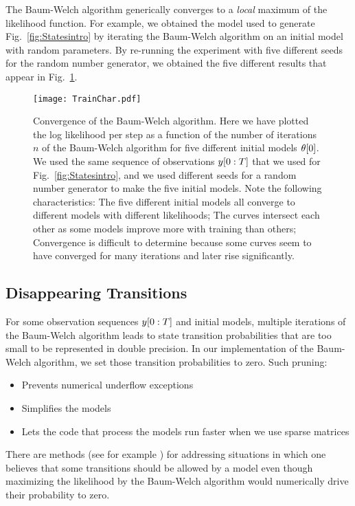 The Baum-Welch algorithm generically converges to a \emph{local}
maximum of the likelihood function.  For example, we obtained the
model used to generate Fig.~\ref{fig:Statesintro} by iterating the
Baum-Welch algorithm on an initial model with random parameters.  By
re-running the experiment with five different seeds for the random
number generator, we obtained the five different results that appear
in Fig.~\ref{fig:TrainChar}.
\begin{figure}
  \centering
  \texttt{[image: TrainChar.pdf]}
  \caption[Convergence of the Baum-Welch algorithm.]{%
    Convergence of the Baum-Welch algorithm.  Here we have
    plotted the log likelihood per step as a function of the number of
    iterations $n$ of the Baum-Welch algorithm for five different
    initial models ${\theta}{[0]}$.  We used the same sequence
    of observations $y[0:T]$ that we used for
    Fig.~\ref{fig:Statesintro}, and we used different seeds for a
    random number generator to make the five initial models.  Note the
    following characteristics: The five different initial models all
    converge to different models with different likelihoods; The curves
    intersect each other as some models improve more with training
    than others; Convergence is difficult to determine because some
    curves seem to have converged for many iterations and later rise
    significantly.  }
  \label{fig:TrainChar}
\end{figure}

\subsection{Disappearing Transitions}
\label{sec:disappear}

For some observation sequences $y[0:T]$ and initial models,
multiple iterations of the Baum-Welch algorithm leads to state
transition probabilities that are too small to be represented in
double precision.  In our implementation of the Baum-Welch algorithm,
we set those transition probabilities to zero.  Such pruning:
\begin{itemize}
\item Prevents numerical underflow exceptions
\item Simplifies the models
\item Lets the code that process the models run faster when we use
  sparse matrices
\end{itemize}
There are methods (see for example \cite{Ormoneit95}) for addressing
situations in which one believes that some transitions should be
allowed by a model even though maximizing the likelihood by the
Baum-Welch algorithm would numerically drive their probability to
zero.

